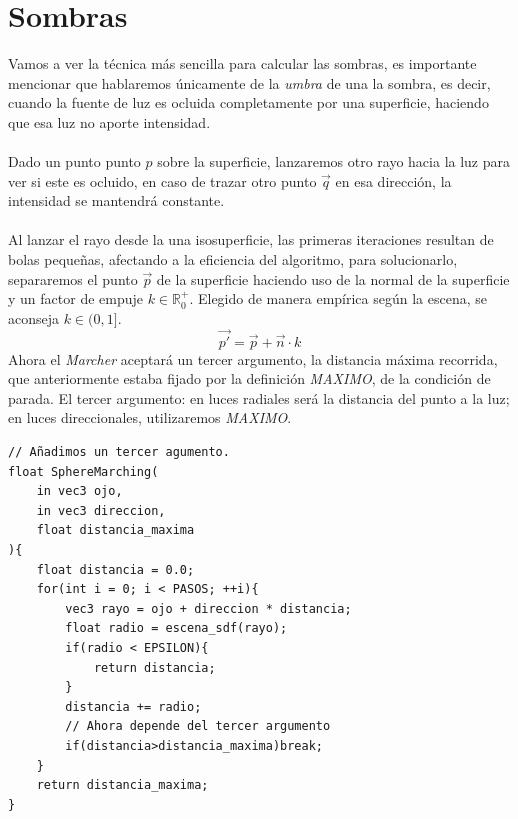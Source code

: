 \section{Sombras}
Vamos a ver la técnica más sencilla para calcular las sombras, es importante mencionar que hablaremos únicamente de la \textit{umbra} de una la sombra, es decir, cuando la fuente de luz es ocluida completamente por una superficie,  haciendo que esa luz no aporte intensidad.\\\\
Dado un punto punto \(p\) sobre la superficie, lanzaremos otro rayo hacia la luz para ver si este es ocluido, en caso de trazar otro punto \(\Vec{q}\) en esa dirección, la intensidad se mantendrá constante.\\\\
Al lanzar el rayo desde la una isosuperficie, las primeras iteraciones resultan de bolas pequeñas, afectando a la eficiencia del algoritmo, para solucionarlo, separaremos el punto \(\Vec{p}\) de la superficie haciendo uso de la normal de la superficie y un factor de empuje \(k\in\mathbb{R}^{+}_{0}\). Elegido de manera empírica según la escena, se aconseja \(k\in(0,1]\).
\[\Vec{p'}=\Vec{p} + \Vec{n} \cdot k\]
Ahora el \textit{Marcher} aceptará un tercer argumento, la distancia máxima recorrida, que anteriormente estaba fijado por la definición \textit{MAXIMO}, de la condición de parada. El tercer argumento: en luces radiales será la distancia del punto a la luz; en luces direccionales, utilizaremos \textit{MAXIMO}.
\newpage
\begin{lstlisting}
// Añadimos un tercer agumento.
float SphereMarching(
    in vec3 ojo, 
    in vec3 direccion,
    float distancia_maxima
){
    float distancia = 0.0;
    for(int i = 0; i < PASOS; ++i){
        vec3 rayo = ojo + direccion * distancia;
        float radio = escena_sdf(rayo);
        if(radio < EPSILON){
            return distancia;
        }
        distancia += radio;
        // Ahora depende del tercer argumento
        if(distancia>distancia_maxima)break;
    }
    return distancia_maxima;
}
\end{lstlisting}

